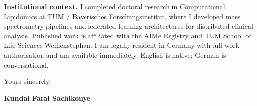 \documentclass[12pt,a4paper]{article}
\begin{document}
\textbf{Institutional context.}
I completed doctoral research in Computational Lipidomics at TUM / Bayerisches
Forschungsinstitut, where I developed mass spectrometry pipelines and federated
learning architectures for distributed clinical analysis. Published work is
affiliated with the AIMe Registry and TUM School of Life Sciences Weihenstephan.
I am legally resident in Germany with full work authorisation and am available
immediately. English is native; German is conversational.

\vspace{1.5em}
Yours sincerely,

\vspace{2.5em}
\textbf{Kundai Farai Sachikonye}
\end{document}
